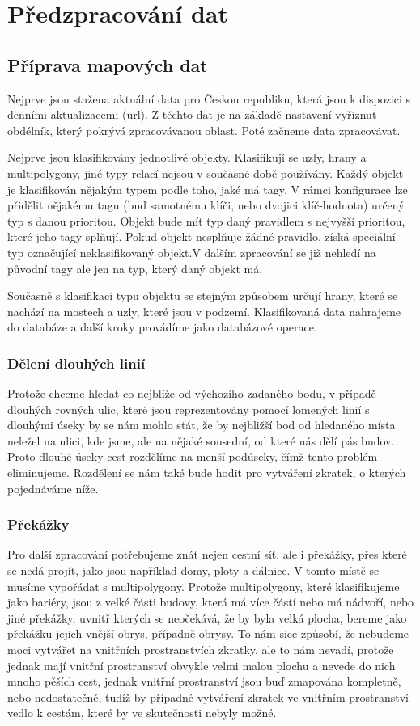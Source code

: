 \chapter{Předzpracování dat}


\section{Příprava mapových dat}
Nejprve jsou stažena aktuální data pro Českou republiku, která jsou k dispozici
s denními aktualizacemi (\TODO url). Z těchto dat je na základě nastavení
vyříznut obdélník, který pokrývá zpracovávanou oblast. Poté začneme data
zpracovávat.

Nejprve jsou klasifikovány jednotlivé objekty. Klasifikují se uzly, hrany a
multipolygony, jiné typy relací nejsou v současné době používány. Každý objekt
je klasifikován nějakým typem podle toho, jaké má tagy. V rámci konfigurace lze
přidělit nějakému tagu (buď samotnému klíči, nebo dvojici klíč-hodnota) určený
typ s danou prioritou. Objekt bude mít typ daný pravidlem s nejvyšší prioritou,
které jeho tagy splňují. Pokud objekt nesplňuje žádné pravidlo, získá speciální
typ označující neklasifikovaný objekt.V dalším zpracování se již nehledí na
původní tagy ale jen na typ, který daný objekt má.

Současně s klasifikací typu objektu se stejným způsobem určují hrany, které se
nachází na mostech a uzly, které jsou v podzemí. Klasifikovaná data nahrajeme do
databáze a další kroky provádíme jako databázové operace. 

\subsection{Dělení dlouhých linií}
Protože chceme hledat co nejblíže od výchozího zadaného bodu, v případě dlouhých
rovných ulic, které jsou reprezentovány pomocí lomených linií s dlouhými úseky
by se nám mohlo stát, že by nejbližší bod od hledaného místa neležel na ulici,
kde jsme, ale na nějaké sousední, od které nás dělí pás budov. Proto dlouhé
úseky cest rozdělíme na menší podúseky, čímž tento problém eliminujeme.
Rozdělení se nám také bude hodit pro vytváření zkratek, o kterých pojednáváme
níže.

\subsection{Překážky}
Pro další zpracování potřebujeme znát nejen cestní síť, ale i překážky, přes
které se nedá projít, jako jsou například domy, ploty a dálnice. V tomto místě
se musíme vypořádat s multipolygony. Protože multipolygony, které klasifikujeme
jako bariéry, jsou z velké části budovy, která má více částí nebo má nádvoří,
nebo jiné překážky, uvnitř kterých se neočekává, že by byla velká plocha, bereme
jako překážku jejich vnější obrys, případně obrysy. To nám sice způsobí, že
nebudeme moci vytvářet na vnitřních prostranstvích zkratky, ale to nám nevadí,
protože jednak mají vnitřní prostranství obvykle velmi malou plochu a nevede do
nich mnoho pěších cest, jednak vnitřní prostranství jsou buď zmapována
kompletně, nebo nedostatečně, tudíž by případné vytváření zkratek ve vnitřním
prostranství vedlo k cestám, které by ve skutečnosti nebyly možné.

